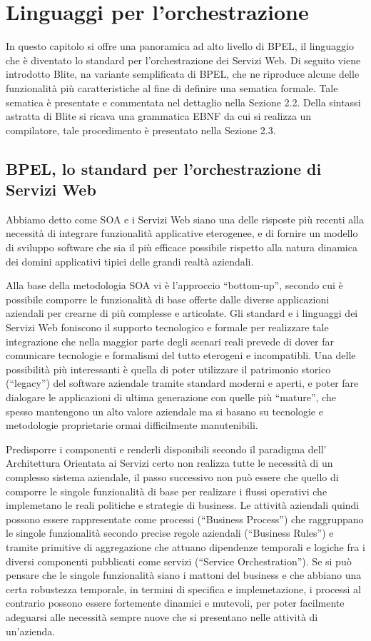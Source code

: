 \chapter{Linguaggi per l'orchestrazione}

\textsf{
In questo capitolo si offre una panoramica ad alto livello di BPEL, il
linguaggio che è diventato lo standard per l'orchestrazione dei Servizi Web.
Di seguito viene introdotto Blite, na variante semplificata di
BPEL, che ne riproduce alcune delle funzionalità più caratteristiche al fine
di definire una sematica formale. Tale sematica è presentate e commentata nel
dettaglio nella Sezione 2.2. Della sintassi astratta di Blite si ricava una
grammatica EBNF da cui si realizza un compilatore, tale procedimento è
presentato nella Sezione 2.3.}

\section{BPEL, lo standard per l'orchestrazione di Servizi Web}
Abbiamo detto come SOA e i Servizi Web siano una delle risposte più recenti
alla necessità di integrare funzionalità applicative eterogenee, e di fornire
un modello di sviluppo software che sia il pi\`u efficace possibile rispetto
alla natura dinamica dei domini applicativi tipici delle grandi realtà
aziendali.

Alla base della metodologia SOA vi è l'approccio ``bottom-up'', secondo cui è
possibile comporre le funzionalità di base offerte dalle diverse applicazioni
aziendali per crearne di più complesse e articolate. Gli standard e i linguaggi
dei Servizi Web foniscono il supporto tecnologico e formale per realizzare tale
integrazione che nella maggior parte degli scenari reali prevede di dover far
comunicare tecnologie e formalismi del tutto eterogeni e incompatibli. Una delle
possibilità più interessanti è quella di poter utilizzare il patrimonio storico
(``legacy'') del software aziendale tramite standard moderni e aperti, e poter
fare dialogare le applicazioni di ultima generazione con quelle più ``mature'',
che spesso mantengono un alto valore aziendale ma si basano su tecnologie e
metodologie proprietarie ormai difficilmente manutenibili.

Predisporre i componenti e renderli disponibili secondo il paradigma dell'
Architettura Orientata ai Servizi certo non realizza tutte le necessità di un
complesso sistema aziendale, il passo successivo non può essere che quello di
comporre le singole funzionalità di base per realizare i flussi operativi che
implemetano le reali politiche e strategie di business. Le attività aziendali
quindi possono essere rappresentate come processi (``Business Process'') che
raggruppano le singole funzionalità secondo precise regole aziendali (``Business
Rules'') e tramite primitive di aggregazione che attuano dipendenze temporali e
logiche fra i diversi componenti pubblicati come servizi (``Service
Orchestration''). Se si può pensare che le singole funzionalità siano i mattoni
del business e che abbiano una certa robustezza temporale, in termini di
specifica e implemetazione, i processi al contrario possono essere fortemente
dinamici e mutevoli, per poter facilmente adeguarsi alle necessità sempre nuove
che si presentano nelle attività di un'azienda.

